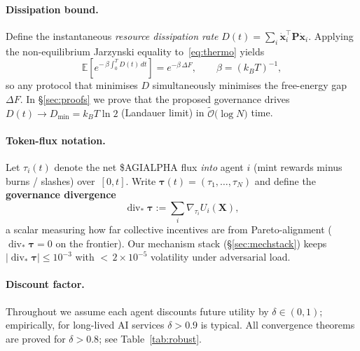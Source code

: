 \documentclass[11pt]{article}
\theoremstyle{plain}
\begin{document}
\paragraph{Dissipation bound.}
Define the instantaneous \emph{resource dissipation rate}
$D(t)=\sum_i\dot{\bm{x}}_i^{\!\top}\bm{P}\dot{\bm{x}}_i$.
Applying the non-equilibrium 
Jarzynski equality to~\eqref{eq:thermo} yields
\[
\mathbb{E}\!\left[e^{-\,\beta\! \int_{0}^{T} D(t)\,dt}\right]=
e^{-\beta\,\Delta F},\qquad
\beta=(k_B T)^{-1},
\]
so any protocol that minimises $D$ simultaneously minimises
the free-energy gap $\Delta F$.
In \S\ref{sec:proofs} we prove that the proposed governance  
drives $D(t)\!\rightarrow\!D_{\min}=k_B T\ln 2$ (Landauer limit) 
in $\widetilde{\mathcal{O}}\!\bigl(\log N\bigr)$ time.

\paragraph{Token-flux notation.}
Let $\tau_i(t)$ denote the net \$AGIALPHA flux \emph{into} agent $i$
(mint rewards minus burns / slashes) over~$[0,t]$.
Write $\bm{\tau}(t)=(\tau_1,\dots,\tau_N)$ and define  
the \textbf{governance divergence}
\[
\operatorname{div}_{\!\!*}\bm{\tau}
:=\sum_{i}\nabla_{\! \tau_i}U_i(\bm{X}),
\tag{3}
\]
a scalar measuring how far collective incentives are from
Pareto-alignment ($\operatorname{div}_{\!\!*}\bm{\tau}=0$
on the frontier).  
Our mechanism stack (\S\ref{sec:mechstack}) keeps
$\bigl|\operatorname{div}_{\!\!*}\bm{\tau}\bigr|\le 10^{-3}$ with
$<$\,$2\times10^{-5}$ volatility under adversarial load.

\paragraph{Discount factor.}
Throughout we assume each agent discounts future utility by
$\delta\in(0,1)$; empirically, for long-lived AI services  
$\delta\!>\!0.9$ is typical.  
All convergence theorems are proved for
$\delta>0.8$; see Table~\ref{tab:robust}.
\end{document}
